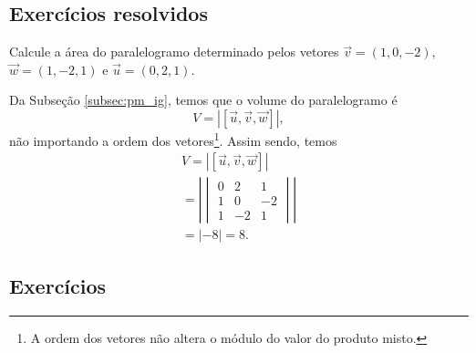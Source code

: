 \subsection*{Exercícios resolvidos}

\begin{exeresol}
  Calcule a área do paralelogramo determinado pelos vetores $\vec{v}=(1,0,-2)$, $\vec{w}=(1,-2,1)$ e $\vec{u}=(0,2,1)$.
\end{exeresol}
\begin{resol}
  Da Subseção \ref{subsec:pm_ig}, temos que o volume do paralelogramo é
  \begin{equation}
    V = |[\vec{u},\vec{v},\vec{w}]|,
  \end{equation}
  não importando a ordem dos vetores\footnote{A ordem dos vetores não altera o módulo do valor do produto misto.}. Assim sendo, temos
  \begin{gather}
    V = |[\vec{u},\vec{v},\vec{w}]| \\
    = \left|
      \begin{vmatrix}
        0 & 2 & 1 \\
        1 & 0 & -2 \\
        1 & -2 & 1 
      \end{vmatrix}
    \right| \\
    = |-8| = 8.
  \end{gather}
\end{resol}

\emconstrucao

\subsection*{Exercícios}

\emconstrucao